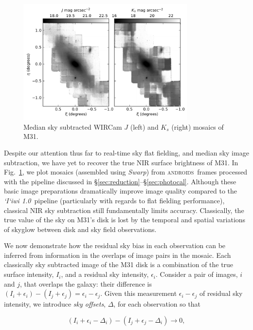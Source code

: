 \documentclass[iop]{emulateapj}
\newcommand{\sw}[1]{\textit{#1}} %
\newcommand{\iiwione}{\sw{`I`iwi 1.0}}
\newcommand{\androids}{\textsc{androids}}
\newcommand{\Fig}[1]{Fig.~\ref{fig:#1}}  %
\newcommand{\Sec}[1]{\S\ref{sec:#1}}  %
\begin{document}
\begin{figure}[t]
\centering
\includegraphics[width=3.5in]{figs/raw_mosaics}
\caption{Median sky subtracted WIRCam $J$ (left) and $K_s$ (right) mosaics of M31.}
\label{fig:raw_mosaics}
\end{figure}

Despite our attention thus far to real-time sky flat fielding, and median sky image subtraction, we have yet to recover the true NIR surface brightness of M31.
In \Fig{raw_mosaics}, we plot mosaics (assembled using \sw{Swarp}) from \androids\ frames processed with the pipeline discussed in \Sec{reduction}--\Sec{photocal}.
Although these basic image preparations dramatically improve image quality compared to the \iiwione\ pipeline (particularly with regards to flat fielding performance), classical NIR sky subtraction still fundamentally limits accuracy.
Classically, the true value of the sky on M31's disk is lost by the temporal and spatial variations of skyglow between disk and sky field observations.

We now demonstrate how the residual sky bias in each observation can be inferred from information in the overlaps of image pairs in the mosaic.
Each classically sky subtracted image of the M31 disk is a combination of the true surface intensity, $I_i$, and a residual sky intensity, $\epsilon_i$.
Consider a pair of images, $i$ and $j$, that overlaps the galaxy: their difference is $(I_i+\epsilon_i) - (I_j+\epsilon_j) = \epsilon_i - \epsilon_j$.
Given this measurement $\epsilon_i - \epsilon_j$ of residual sky intensity, we introduce \emph{sky offsets}, $\Delta$, for each observation so that

\begin{equation}
    (I_i + \epsilon_i - \Delta_i) - (I_j + \epsilon_j - \Delta_i) \rightarrow 0,
\end{equation}
\end{document}
